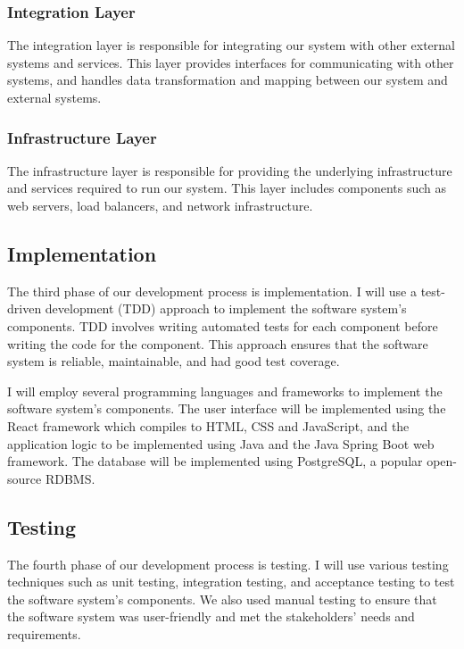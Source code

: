 \documentclass{article}
\begin{document}
\subsubsection{Integration Layer}

The integration layer is responsible for integrating our system with other external systems and services. This layer provides interfaces for communicating with other systems, and handles data transformation and mapping between our system and external systems.

\subsubsection{Infrastructure Layer}

The infrastructure layer is responsible for providing the underlying infrastructure and services required to run our system. This layer includes components such as web servers, load balancers, and network infrastructure.


\subsection{Implementation}

The third phase of our development process is implementation. I will use a test-driven development (TDD) approach to implement the software system's components. TDD involves writing automated tests for each component before writing the code for the component. This approach ensures that the software system is reliable, maintainable, and had good test coverage.

I will employ several programming languages and frameworks to implement the software system's components. The user interface will be implemented using the React framework which compiles to HTML, CSS and JavaScript, and the application logic to be implemented using Java and the Java Spring Boot web framework. The database will be implemented using PostgreSQL, a popular open-source RDBMS.

\subsection{Testing}

The fourth phase of our development process is testing. I will use various testing techniques such as unit testing, integration testing, and acceptance testing to test the software system's components. We also used manual testing to ensure that the software system was user-friendly and met the stakeholders' needs and requirements.
\end{document}
